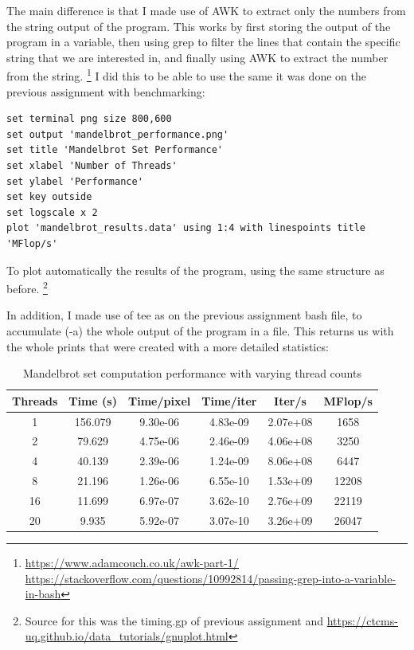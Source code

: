 \documentclass[unicode,11pt,a4paper,oneside,numbers=endperiod,openany]{scrartcl}
\begin{document}
The main difference is that I made use of AWK to extract only the numbers from the string output of the program.
This works by first storing the output of the program in a variable, then using grep to filter the lines 
that contain the specific string that we are interested in, and finally using AWK to extract the number from the string.
\footnote{
    \url{https://www.adamcouch.co.uk/awk-part-1/}
    \newline \url{https://stackoverflow.com/questions/10992814/passing-grep-into-a-variable-in-bash}
}
I did this to be able to use the same it was done on the previous assignment with benchmarking:
\begin{lstlisting}
set terminal png size 800,600
set output 'mandelbrot_performance.png'
set title 'Mandelbrot Set Performance'
set xlabel 'Number of Threads'
set ylabel 'Performance'
set key outside
set logscale x 2
plot 'mandelbrot_results.data' using 1:4 with linespoints title 'MFlop/s'
\end{lstlisting}
To plot automatically the results of the program, using the same structure as before.
\footnote{Source for this was the timing.gp of previous assignment 
\newline and
\url{https://ctcms-uq.github.io/data_tutorials/gnuplot.html}}

In addition, I made use of tee as on the previous assignment bash file, to accumulate (-a) the whole output of the program in a file.
This returns us with the whole prints that were created with a more detailed statistics: 

\begin{table}[h]
\centering
\small
\begin{tabular}{|c|c|c|c|c|c|}
\hline
\textbf{Threads} & \textbf{Time (s)} & \textbf{Time/pixel} & \textbf{Time/iter} & \textbf{Iter/s} & \textbf{MFlop/s} \\
\hline
1 & 156.079 & 9.30e-06 & 4.83e-09 & 2.07e+08 & 1658 \\
2 & 79.629 & 4.75e-06 & 2.46e-09 & 4.06e+08 & 3250 \\
4 & 40.139 & 2.39e-06 & 1.24e-09 & 8.06e+08 & 6447 \\
8 & 21.196 & 1.26e-06 & 6.55e-10 & 1.53e+09 & 12208 \\
16 & 11.699 & 6.97e-07 & 3.62e-10 & 2.76e+09 & 22119 \\
20 & 9.935 & 5.92e-07 & 3.07e-10 & 3.26e+09 & 26047 \\
\hline
\end{tabular}
\caption{Mandelbrot set computation performance with varying thread counts}
\label{tab:mandelbrot_perf}
\end{table}
\end{document}
